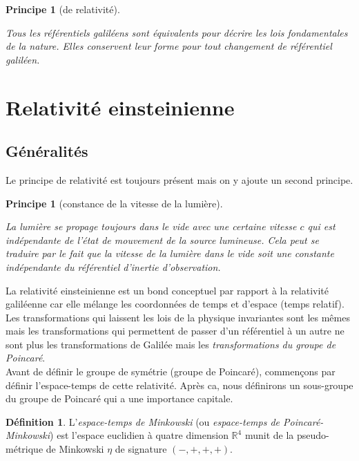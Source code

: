 \documentclass[a4paper,11pt]{report}
\theoremstyle{definition}
\theoremstyle{plain}
\newtheorem{prin}[thm]{Principe}
\theoremstyle{definition}
\newtheorem{defn}{Définition}[chapter]
\theoremstyle{remark}
\begin{document}
        \begin{prin}[de relativité]
        \begin{leftbar}
            Tous les référentiels galiléens sont équivalents pour décrire les lois fondamentales de la nature. Elles conservent leur forme pour tout changement de référentiel galiléen.
        \end{leftbar}
        \end{prin}
    
    \section{Relativité einsteinienne}
    
        \subsection{Généralités}
    
            Le principe de relativité est toujours présent mais on y ajoute un second principe.
            
            \begin{prin}[constance de la vitesse de la lumière]
            \begin{leftbar}
                La lumière se propage toujours dans le vide avec une certaine vitesse $c$ qui est indépendante de l'état de mouvement de la source lumineuse. Cela peut se traduire par le fait que la vitesse de la lumière dans le vide soit une constante indépendante du référentiel d'inertie d'observation.
            \end{leftbar}
            \end{prin}
            
            La relativité einsteinienne est un bond conceptuel par rapport à la relativité galiléenne car elle mélange les coordonnées de temps et d'espace (temps relatif). Les transformations qui laissent les lois de la physique invariantes sont les mêmes mais les transformations qui permettent de passer d'un référentiel à un autre ne sont plus les transformations de Galilée mais les \textit{transformations du groupe de Poincaré}.\\
            
            Avant de définir le groupe de symétrie (groupe de Poincaré), commençons par définir l'espace-temps de cette relativité. Après ca, nous définirons un sous-groupe du groupe de Poincaré qui a une importance capitale.
            
            \begin{defn}
                L'\textit{espace-temps de Minkowski} (ou \textit{espace-temps de Poincaré-Minkowski}) est l'espace euclidien à quatre dimension $\mathbb{R}^4$ munit de la pseudo-métrique de Minkowski $\eta$ de signature $(-,+,+,+)$.
            \end{defn}
            
\end{document}
